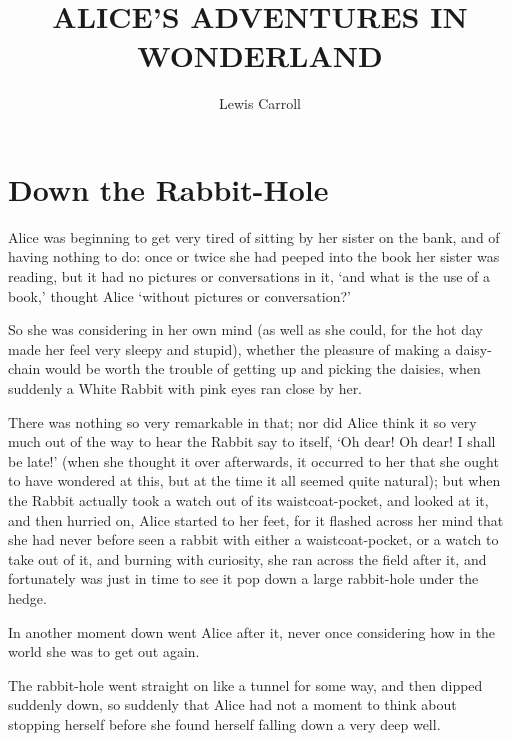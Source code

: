 \documentclass[statementpaper,twoside,openany]{memoir}
\title{ALICE'S ADVENTURES IN WONDERLAND}
\author{Lewis Carroll}
\date{}
\begin{document}
\newpage\null\thispagestyle{empty}\newpage
\newpage\null\thispagestyle{empty}\newpage

\maketitle

\newpage\null\thispagestyle{empty}\newpage

\tableofcontents

\newpage\null\thispagestyle{empty}\newpage

\chapter{Down the Rabbit-Hole}

Alice was beginning to get very tired of sitting by her sister on the bank, and of having nothing to do: once or twice she had peeped into the book her sister was reading, but it had no pictures or conversations in it, `and what is the use of a book,' thought Alice `without pictures or conversation?'

So she was considering in her own mind (as well as she could, for the hot day made her feel very sleepy and stupid), whether the pleasure of making a daisy-chain would be worth the trouble of getting up and picking the daisies, when suddenly a White Rabbit with pink eyes ran close by her.

There was nothing so very remarkable in that; nor did Alice think it so very much out of the way to hear the Rabbit say to itself, `Oh dear! Oh dear! I shall be late!' (when she thought it over afterwards, it occurred to her that she ought to have wondered at this, but at the time it all seemed quite natural); but when the Rabbit actually took a watch out of its waistcoat-pocket, and looked at it, and then hurried on, Alice started to her feet, for it flashed across her mind that she had never before seen a rabbit with either a waistcoat-pocket, or a watch to take out of it, and burning with curiosity, she ran across the field after it, and fortunately was just in time to see it pop down a large rabbit-hole under the hedge.

In another moment down went Alice after it, never once considering how in the world she was to get out again.

The rabbit-hole went straight on like a tunnel for some way, and then dipped suddenly down, so suddenly that Alice had not a moment to think about stopping herself before she found herself falling down a very deep well.
\end{document}
